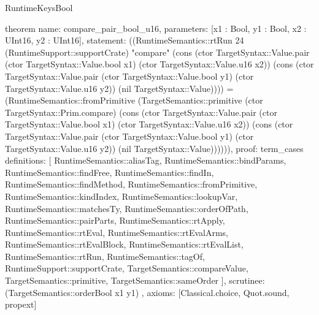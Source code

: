 \begin{lexlean}{RuntimeKeysBool}
\begin{semanticmodule}
theorem{
  name: compare_pair_bool_u16,
  parameters: [x1 : Bool, y1 : Bool, x2 : UInt16, y2 : UInt16],
  statement: ((RuntimeSemantics::rtRun 24 (RuntimeSupport::supportCrate) "compare" (cons (ctor TargetSyntax::Value.pair (ctor TargetSyntax::Value.bool x1) (ctor TargetSyntax::Value.u16 x2)) (cons (ctor TargetSyntax::Value.pair (ctor TargetSyntax::Value.bool y1) (ctor TargetSyntax::Value.u16 y2)) (nil TargetSyntax::Value)))) = (RuntimeSemantics::fromPrimitive (TargetSemantics::primitive (ctor TargetSyntax::Prim.compare) (cons (ctor TargetSyntax::Value.pair (ctor TargetSyntax::Value.bool x1) (ctor TargetSyntax::Value.u16 x2)) (cons (ctor TargetSyntax::Value.pair (ctor TargetSyntax::Value.bool y1) (ctor TargetSyntax::Value.u16 y2)) (nil TargetSyntax::Value)))))),
  proof: term_cases{
    definitions: [
      RuntimeSemantics::aliasTag,
      RuntimeSemantics::bindParams,
      RuntimeSemantics::findFree,
      RuntimeSemantics::findIn,
      RuntimeSemantics::findMethod,
      RuntimeSemantics::fromPrimitive,
      RuntimeSemantics::kindIndex,
      RuntimeSemantics::lookupVar,
      RuntimeSemantics::matchesTy,
      RuntimeSemantics::orderOfPath,
      RuntimeSemantics::pairParts,
      RuntimeSemantics::rtApply,
      RuntimeSemantics::rtEval,
      RuntimeSemantics::rtEvalArms,
      RuntimeSemantics::rtEvalBlock,
      RuntimeSemantics::rtEvalList,
      RuntimeSemantics::rtRun,
      RuntimeSemantics::tagOf,
      RuntimeSupport::supportCrate,
      TargetSemantics::compareValue,
      TargetSemantics::primitive,
      TargetSemantics::sameOrder
    ],
    scrutinee: (TargetSemantics::orderBool x1 y1)
  },
  axioms: [Classical.choice, Quot.sound, propext]
}


\end{semanticmodule}
\end{lexlean}
